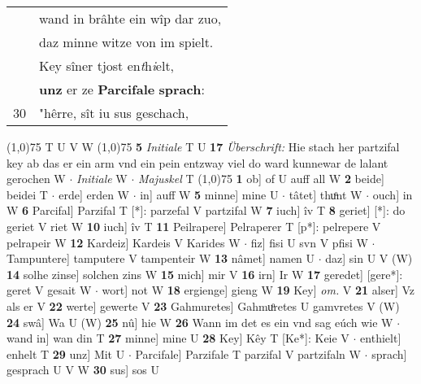 \documentclass[8pt,a4paper,notitlepage]{article}
\begin{document}
\begin{table}[ht]
\begin{minipage}[t]{0.5\linewidth}
\begin{tabular}{rl}
 & wand in brâhte ein wîp dar zuo,\\ 
 & daz minne witze von im spielt.\\ 
 & Key sîner tjost en\textit{t}h\textit{i}elt,\\ 
 & \textbf{unz} er ze \textbf{Parcifale} \textbf{sprach}:\\ 
30 & "hêrre, sît iu sus geschach,\\ 
\end{tabular}
\scriptsize
\line(1,0){75} \newline
T U V W \newline
\line(1,0){75} \newline
\textbf{5} \textit{Initiale} T U  \textbf{17} \textit{Überschrift:} Hie stach her partzifal key ab das er ein arm vnd ein pein entzway viel do ward kunnewar de lalant gerochen W   $\cdot$ \textit{Initiale} W   $\cdot$ \textit{Majuskel} T  \newline
\line(1,0){75} \newline
\textbf{1} ob] of U auff all W \textbf{2} beide] beidei T  $\cdot$ erde] erden W  $\cdot$ in] auff W \textbf{5} minne] mine U  $\cdot$ tâtet] thuͦnt W  $\cdot$ ouch] in W \textbf{6} Parcifal] Parzifal T [*]: parzefal V partzifal W \textbf{7} iuch] îv T \textbf{8} geriet] [*]: do geriet V riet W \textbf{10} iuch] îv T \textbf{11} Peilrapere] Pelraperer T [p*]: pelrepere V pelrapeir W \textbf{12} Kardeiz] Kardeis V Karides W  $\cdot$ fiz] fisi U svn V pfisi W  $\cdot$ Tampuntere] tamputere V tampenteir W \textbf{13} nâmet] namen U  $\cdot$ daz] sin U V (W) \textbf{14} solhe zinse] solchen zins W \textbf{15} mich] mir V \textbf{16} irn] Ir W \textbf{17} geredet] [gere*]: geret V gesait W  $\cdot$ wort] not W \textbf{18} ergienge] gieng W \textbf{19} Key] \textit{om.} V \textbf{21} alser] Vz als er V \textbf{22} werte] gewerte V \textbf{23} Gahmuretes] Gahmuͦretes U gamvretes V (W) \textbf{24} swâ] Wa U (W) \textbf{25} nû] hie W \textbf{26} Wann im det es ein vnd sag eúch wie W  $\cdot$ wand in] wan din T \textbf{27} minne] mine U \textbf{28} Key] Kêy T [Ke*]: Keie V  $\cdot$ enthielt] enhelt T \textbf{29} unz] Mit U  $\cdot$ Parcifale] Parzifale T parzifal V partzifaln W  $\cdot$ sprach] gesprach U V W \textbf{30} sus] sos U \newline
\end{minipage}
\end{table}
\end{document}
